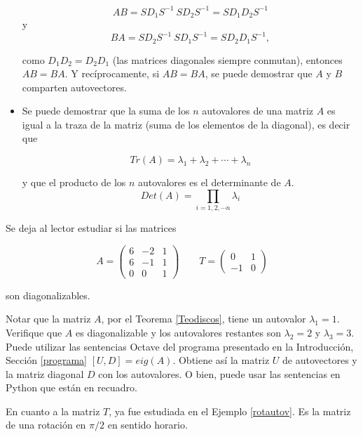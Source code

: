 \begin{remark}
\begin{itemize}
$$AB=  SD_1S^{-1} ~SD_2 S^{-1}=S  D_1D_2 S^{-1}$$
y
\bigskip
$$BA=  SD_2S^{-1} ~SD_1 S^{-1}= S D_2D_1 S^{-1},$$

\bigskip

como $D_1D_2=D_2D_1$  (las matrices diagonales siempre conmutan), entonces $AB=BA$. 
Y recíprocamente, si $AB=BA$, se puede demostrar que $A$ y $B$ comparten autovectores.

\item 

\bigskip

Se puede demostrar que la suma de los $n$ autovalores de una matriz $A$ es igual a la traza de la matriz (suma de los elementos de la diagonal), es decir que 

$$Tr(A)= \lambda_1+ \lambda_2 + \cdots +\lambda_n$$

\noindent
y que el producto de los $n$ autovalores  es el determinante de $A$.
$$Det(A)= \prod_{i=1,2,  \cdots n} \lambda_i$$ 
\end{itemize}
\end{remark}


\bigskip

\begin{example}

Se deja al lector estudiar si las matrices

$$A=\left(\begin{array}{ccc} 6 & -2 &  1 \\ 6 & -1 & 1
\\ 0 & 0 & 1
\end{array}
 \right)  \qquad  T=\left(\begin{array}{cc}  0 & 1  \\ -1 &  0
\end{array}
\right) $$

\noindent
son  diagonalizables.

 Notar que la matriz $A$, por el Teorema \ref{Teodiscos}, tiene un autovalor $\lambda_1=1$.
 Verifique que $A$ es diagonalizable y  los autovalores restantes son $\lambda_2=2$ y $\lambda_3=3$. Puede utilizar  las sentencias  Octave del programa presentado en la Introducción, Sección \ref{programa} $[U,D]=eig(A)$. Obtiene así la matriz $U$ de autovectores y la matriz diagonal $D$ con los autovalores. O bien, puede usar  las sentencias en Python que están en recuadro.

 \bigskip 
 
 En cuanto a la matriz $T$, ya fue estudiada en el Ejemplo \ref{rotautov}. Es la matriz de una rotación en $\pi/2$ en sentido horario.
 
\end{example}


